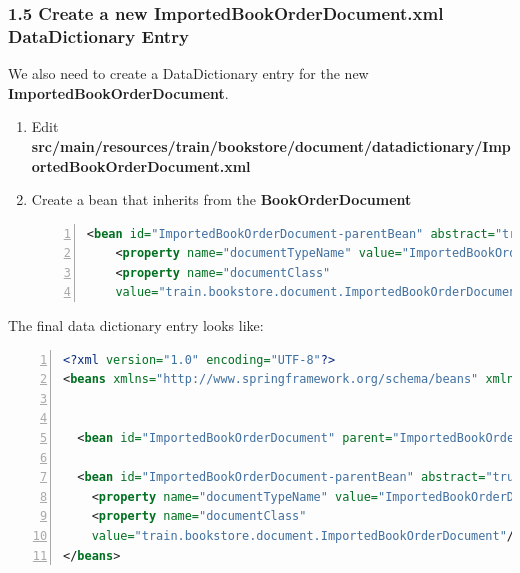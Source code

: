 \subsubsection*{1.5 Create a new ImportedBookOrderDocument.xml
  DataDictionary Entry}
We also need to create a DataDictionary entry for the new
\textbf{ImportedBookOrderDocument}.
\begin{enumerate}
  \item Edit
    \textbf{src/main/resources/train/bookstore/document/datadictionary/ImportedBookOrderDocument.xml}
  \item Create a bean that inherits from the
    \textbf{BookOrderDocument}
\begin{lstlisting}[numbers=left,language=xml,basicstyle=\scriptsize,backgroundcolor=\color{ubergray},caption={ImportBookOrderDocument.xml},frame=single,breaklines=true]
  <bean id="ImportedBookOrderDocument-parentBean" abstract="true" parent="BookOrderDocument-parentBean">
	<property name="documentTypeName" value="ImportedBookOrderDocumentType"/>
	<property name="documentClass"
    value="train.bookstore.document.ImportedBookOrderDocument"/>
  \end{lstlisting}
\end{enumerate}

The final data dictionary entry looks like:
\begin{lstlisting}[numbers=left,language=xml,basicstyle=\scriptsize,backgroundcolor=\color{ubergray},caption={ImportBookOrderDocument.xml},frame=single,breaklines=true]
<?xml version="1.0" encoding="UTF-8"?>
<beans xmlns="http://www.springframework.org/schema/beans" xmlns:xsi="http://www.w3.org/2001/XMLSchema-instance" xmlns:p="http://www.springframework.org/schema/p" xmlns:dd="http://rice.kuali.org/dd" xsi:schemaLocation="http://www.springframework.org/schema/beans     	http://www.springframework.org/schema/beans/spring-beans-2.0.xsd     	http://rice.kuali.org/dd     	http://rice.kuali.org/dd/dd.xsd">


  <bean id="ImportedBookOrderDocument" parent="ImportedBookOrderDocument-parentBean"/>

  <bean id="ImportedBookOrderDocument-parentBean" abstract="true" parent="BookOrderDocument-parentBean">
	<property name="documentTypeName" value="ImportedBookOrderDocumentType"/>
	<property name="documentClass"
    value="train.bookstore.document.ImportedBookOrderDocument"/>
</beans>
\end{lstlisting}


